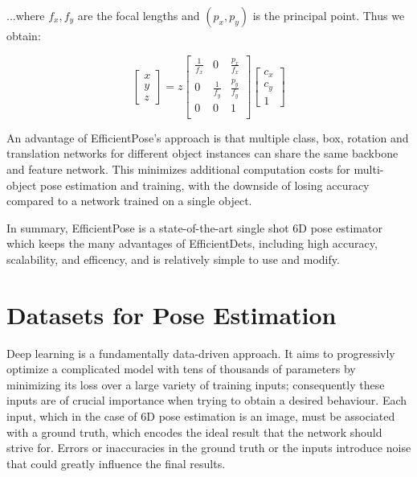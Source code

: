 ...where $f_x, f_y$ are the focal lengths and $(p_x, p_y)$ is the principal point. Thus we obtain:

\begin{equation}
    \begin{bmatrix}
        x\\y\\z
    \end{bmatrix}
    =z
    \begin{bmatrix}
        \frac{1}{f_x} & 0 & \frac{p_x}{f_x} \\
        0 & \frac{1}{f_y} & \frac{p_y}{f_y} \\
        0 & 0 & 1 \\
    \end{bmatrix}
    \begin{bmatrix}
        c_x\\c_y\\1
    \end{bmatrix}
\end{equation}

An advantage of EfficientPose's approach is that multiple class, box, rotation and translation networks for different object instances can share the same backbone and feature network. This minimizes additional computation costs for multi-object pose estimation and training, with the downside of losing accuracy compared to a network trained on a single object. 

In summary, EfficientPose is a state-of-the-art single shot 6D pose estimator which keeps the many advantages of EfficientDets, including high accuracy, scalability, and efficency, and is relatively simple to use and modify.

\section{Datasets for Pose Estimation}

Deep learning is a fundamentally data-driven approach. It aims to progressivly optimize a complicated model with tens of thousands of parameters by minimizing its loss over a large variety of training inputs; consequently these inputs are of crucial importance when trying to obtain a desired behaviour. Each input, which in the case of 6D pose estimation is an image, must be associated with a ground truth, which encodes the ideal result that the network should strive for. Errors or inaccuracies in the ground truth or the inputs introduce noise that could greatly influence the final results.

